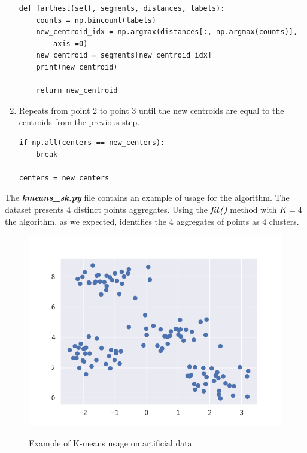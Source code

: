 \documentclass[12pt]{article}
\begin{document}
\begin{enumerate}
				\begin{lstlisting}
def farthest(self, segments, distances, labels):
	counts = np.bincount(labels)
	new_centroid_idx = np.argmax(distances[:, np.argmax(counts)],
		axis =0)
	new_centroid = segments[new_centroid_idx]
	print(new_centroid)
								
	return new_centroid	
				\end{lstlisting}
				 
			\item Repeats from point 2 to point 3 until the new centroids are equal to the centroids from the previous step.
			\begin{lstlisting}
if np.all(centers == new_centers):
	break

centers = new_centers
			\end{lstlisting}
			
		\end{enumerate}
	
		

	
		The \textbf{\textit{kmeans\_sk.py}} file contains an example of usage for the algorithm. The dataset presents 4 distinct points aggregates. Using the \textbf{\textit{fit()}} method with $K = 4$ the algorithm, as we expected, identifies the 4 aggregates of points as 4 clusters.
		
		\begin{figure}[h!]
			\centering
			\includegraphics[scale=0.60]{img/points.png}
			\label{fig1}
			\caption{Example of K-means usage on artificial data. }
		\end{figure}
	
\end{document}
